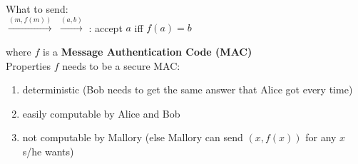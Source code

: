 What to send:\\

 $\xrightarrow{(m, f(m))}$
     $\xrightarrow{(a,b)}$
     : accept $a$ iff $f(a) = b$

where $f$ is a {\bf Message Authentication Code (MAC)}\\

Properties $f$ needs to be a secure MAC:
\begin{enumerate}
    \item deterministic (Bob needs to get the same answer that Alice got every time)
    \item easily computable by Alice and Bob
    \item not computable by Mallory (else Mallory can send $(x, f(x))$ for any
        $x$ s/he wants)
\end{enumerate}

